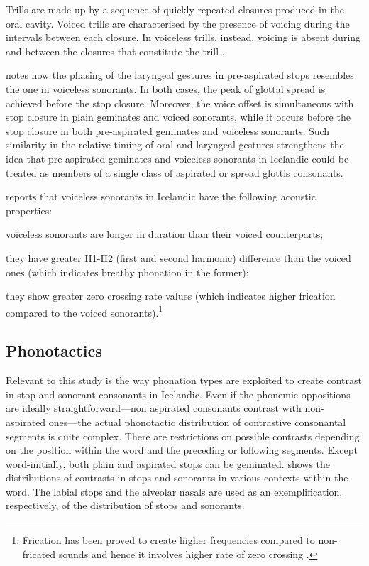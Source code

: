 \documentclass[11pt,a4paper,openany]{memoir}\usepackage[]{graphicx}\usepackage[]{color}
\begin{document}
Trills are made up by a sequence of quickly repeated closures produced in the oral cavity.
Voiced trills are characterised by the presence of voicing during the intervals between each closure.
In voiceless trills, instead, voicing is absent during and between the closures that constitute the trill \citep[236]{ladefoged1996}.

\citet{helgason2002} notes how the phasing of the laryngeal gestures in pre-aspirated stops resembles the one in voiceless sonorants.
In both cases, the peak of glottal spread is achieved before the stop closure.
Moreover, the voice offset is simultaneous with stop closure in plain geminates and voiced sonorants, while it occurs before the stop closure in both pre-aspirated geminates and voiceless sonorants.
Such similarity in the relative timing of oral and laryngeal gestures strengthens the idea that pre-aspirated geminates and voiceless sonorants in Icelandic could be treated as members of a single class of aspirated or spread glottis consonants.

\citet{bombien2006} reports that voiceless sonorants in Icelandic have the following acoustic properties: 
\begin{inparaenum}[(i)]
\item voiceless sonorants are longer in duration than their voiced counterparts;
\item they have greater H1-H2 (first and second harmonic) difference than the voiced ones (which indicates breathy phonation in the former);
\item they show greater zero crossing rate values (which indicates higher frication compared to the voiced sonorants).\footnote{Frication has been proved to create higher frequencies compared to non-fricated sounds and hence it involves higher rate of zero crossing \citep{weigelt1990}.}
\end{inparaenum}

\subsection{Phonotactics}

Relevant to this study is the way phonation types are exploited to create contrast in stop and sonorant consonants in Icelandic.
Even if the phonemic oppositions are ideally straightforward---non aspirated consonants contrast with non-aspirated ones---the actual phonotactic distribution of contrastive consonantal segments is quite complex.
There are restrictions on possible contrasts depending on the position within the word and the preceding or following segments. Except word-initially, both plain and aspirated stops can be geminated.
 shows the distributions of contrasts in stops and sonorants in various contexts within the word.
The labial stops and the alveolar nasals are used as an exemplification, respectively, of the distribution of stops and sonorants.
\end{document}
